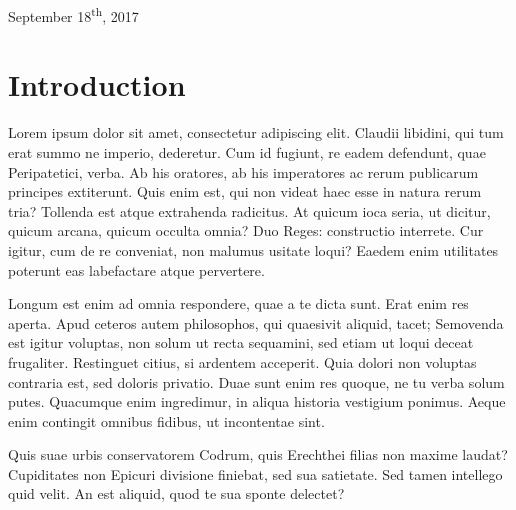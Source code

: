 \documentclass[12pt,twoside]{article}
\begin{document}
\begin{titlepage}
\begin{center}
			
			
			{\large September 18\textsuperscript{th}, 2017}\\
			
			\vfill %
			
		\end{center} %
		
	\end{titlepage} %
	
	\renewcommand{\thepage}{\roman{page}} %
	\newpage %
	\tableofcontents
	\newpage
	\listoffigures
	\newpage
	
	\renewcommand{\thepage}{\arabic{page}}
	\setcounter{page}{1}
		
	\section{Introduction}
	Lorem ipsum dolor sit amet, consectetur adipiscing elit. Claudii libidini, qui tum erat summo ne imperio, dederetur. Cum id fugiunt, re eadem defendunt, quae Peripatetici, verba. Ab his oratores, ab his imperatores ac rerum publicarum principes extiterunt. Quis enim est, qui non videat haec esse in natura rerum tria? Tollenda est atque extrahenda radicitus. At quicum ioca seria, ut dicitur, quicum arcana, quicum occulta omnia? Duo Reges: constructio interrete. Cur igitur, cum de re conveniat, non malumus usitate loqui? Eaedem enim utilitates poterunt eas labefactare atque pervertere.
	
	Longum est enim ad omnia respondere, quae a te dicta sunt. Erat enim res aperta. Apud ceteros autem philosophos, qui quaesivit aliquid, tacet; Semovenda est igitur voluptas, non solum ut recta sequamini, sed etiam ut loqui deceat frugaliter. Restinguet citius, si ardentem acceperit. Quia dolori non voluptas contraria est, sed doloris privatio. Duae sunt enim res quoque, ne tu verba solum putes. Quacumque enim ingredimur, in aliqua historia vestigium ponimus. Aeque enim contingit omnibus fidibus, ut incontentae sint.
	
	Quis suae urbis conservatorem Codrum, quis Erechthei filias non maxime laudat? Cupiditates non Epicuri divisione finiebat, sed sua satietate. Sed tamen intellego quid velit. An est aliquid, quod te sua sponte delectet?
	
\end{document}
